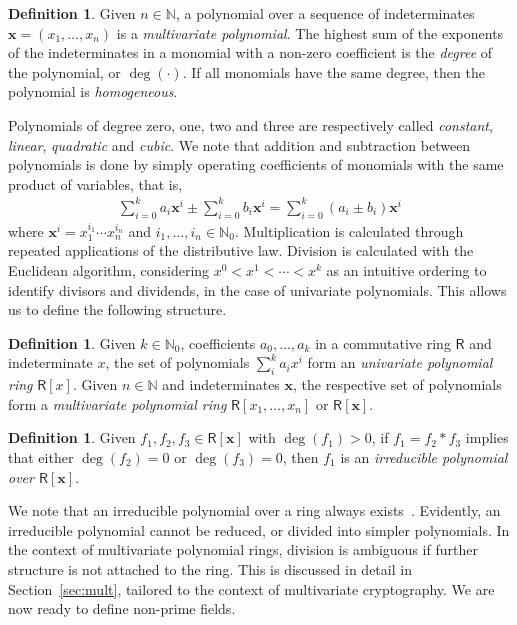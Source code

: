 \documentclass[12pt, a4paper, oneside]{memoir}
\theoremstyle{definition}
\newtheorem{definition}[theorem]{Definition}
\begin{document}
\begin{definition}
  Given $n \in \mathbb{N}$, a polynomial over a sequence of indeterminates $\mathbf{x} = (x_{1}, \dots, x_{n})$ is a \emph{multivariate polynomial}. The highest sum of the exponents of the indeterminates in a monomial with a non-zero coefficient is the \emph{degree} of the polynomial, or $\deg(\cdot)$. If all monomials have the same degree, then the polynomial is \emph{homogeneous}.
\end{definition}

Polynomials of degree zero, one, two and three are respectively called \emph{constant}, \emph{linear}, \emph{quadratic} and \emph{cubic}. We note that addition and subtraction between polynomials is done by simply operating coefficients of monomials with the same product of variables, that is,
\begin{align}
  \sum_{i = 0}^{k} a_{i} \mathbf{x}^{i} \pm \sum_{i = 0}^{k} b_{i} \mathbf{x}^{i} = \sum_{i = 0}^{k} (a_{i} \pm b_{i}) \mathbf{x}^{i}
\end{align}
where $\mathbf{x}^{i} = x_{1}^{i_{1}} \cdots x_{n}^{i_{n}}$ and $i_{1}, \dots, i_{n} \in \mathbb{N}_{0}$. Multiplication is calculated through repeated applications of the distributive law. Division is calculated with the Euclidean algorithm, considering $x^{0} < x^{1} < \cdots < x^{k}$ as an intuitive ordering to identify divisors and dividends, in the case of univariate polynomials. This allows us to define the following structure.

\begin{definition}
  Given $k \in \mathbb{N}_{0}$, coefficients $a_{0}, \dots, a_{k}$ in a commutative ring $\mathsf{R}$ and indeterminate $x$, the set of polynomials $\sum_{i}^{k} a_{i} x^{i}$ form an \emph{univariate polynomial ring} $\mathsf{R}[x]$. Given $n \in \mathbb{N}$ and indeterminates $\mathbf{x}$, the respective set of polynomials form a \emph{multivariate polynomial ring} $\mathsf{R}[x_{1}, \dots, x_{n}]$ or $\mathsf{R}[\mathbf{x}]$.
\end{definition}

\begin{definition}
  Given $f_{1}, f_{2}, f_{3} \in \mathsf{R}[\mathbf{x}]$ with $\deg(f_{1}) > 0$, if $f_{1} = f_{2} \ast f_{3}$ implies that either $\deg(f_{2}) = 0$ or $\deg(f_{3}) = 0$, then $f_{1}$ is an \emph{irreducible polynomial over $\mathsf{R}[\mathbf{x}]$}.
\end{definition}

We note that an irreducible polynomial over a ring always exists~\cite[Remark~2.1.25]{Mullen:2013}. Evidently, an irreducible polynomial cannot be reduced, or divided into simpler polynomials. In the context of multivariate polynomial rings, division is ambiguous if further structure is not attached to the ring. This is discussed in detail in Section~\ref{sec:mult}, tailored to the context of multivariate cryptography. We are now ready to define non-prime fields.
\end{document}
